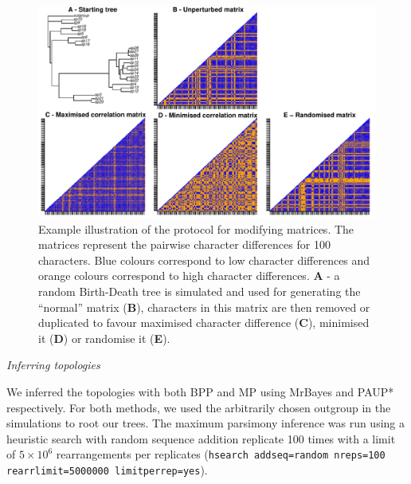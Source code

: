 \documentclass[12pt,letterpaper]{article}
\renewcommand{\subsection}[1]{%
\bigskip
\begin{center}
\begin{large}
\normalfont\itshape #1
\end{large}
\end{center}}
\begin{document}
\begin{figure}[!htbp]
\centering
   \includegraphics[width=1\textwidth]{Figures/Modif_matrix.pdf}
\caption{Example illustration of the protocol for modifying matrices. The matrices represent the pairwise character differences for 100 characters. Blue colours correspond to low character differences and orange colours correspond to high character differences. \textbf{A} - a random Birth-Death tree is simulated and used for generating the ``normal'' matrix (\textbf{B}), characters in this matrix are then removed or duplicated to favour maximised character difference (\textbf{C}), minimised it (\textbf{D}) or randomise it (\textbf{E}).}
\label{Fig:modif_matrix}
\end{figure}

\subsection{Inferring topologies}
We inferred the topologies with both BPP and MP using MrBayes \citep[v3.2.6;][]{Ronquist2012mrbayes} and PAUP* \citep[v4.0a151;][]{swofford2001paup} respectively.
For both methods, we used the arbitrarily chosen outgroup in the simulations to root our trees.
The maximum parsimony inference was run using a heuristic search with random sequence addition replicate 100 times with a limit of $5\times10^6$ rearrangements per replicates (\texttt{hsearch addseq=random nreps=100 rearrlimit=5000000 limitperrep=yes}).
\end{document}
